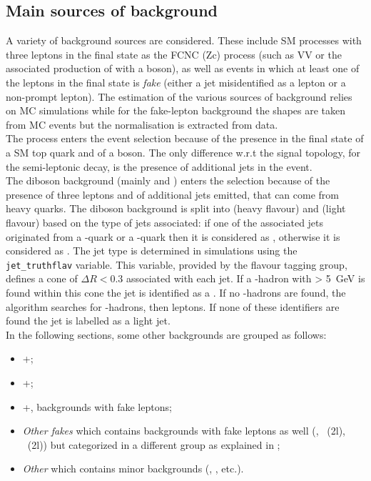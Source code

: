 \subsection{Main sources of background}
\label{sec:background}
A variety of background sources are considered.
These include SM processes with three leptons in the final state as the FCNC \ttbar (Zc)
process (such as VV or the associated production of \ttbar with
a \PZ boson), as well as events in which at least one of the leptons
in the final state is \textit{fake} (either a jet misidentified as a
lepton or a non-prompt lepton).
The estimation of the various sources of background relies on MC
simulations while for the
\ttbar fake-lepton background the shapes are taken from MC events but the
normalisation is extracted from data. \\
The \ttZ process enters the event selection because of the presence in the
final state of a SM top quark and of a \PZ boson. The only difference
w.r.t the signal topology, for the semi-leptonic \ttbar decay, is the
presence of additional jets in the event. \\
The diboson background (mainly \PW\PZ and \PZ\PZ) enters the selection because of the presence
of three leptons and of additional jets emitted, that can come from heavy
quarks. 
The diboson background is split into \VVHF (heavy flavour) and \VVLF (light flavour) based on the type of jets associated:
if one of the associated jets originated from a \Pqb-quark or a \Pqc-quark then it is considered as \VVHF, otherwise it is considered as \VVLF. %
The jet type is determined in simulations using the \texttt{jet\_truthflav} variable.
This variable, provided by the flavour tagging group, defines a cone of $\Delta R < 0.3$ associated with each jet.
If a \Pqb-hadron with \pT > \SI{5}{\GeV} is found within this cone the jet is identified as a \bjet.
If no \Pqb-hadrons are found, the algorithm searches for \Pqc-hadrons, then \Pgt leptons.
If none of these identifiers are found the jet is labelled as a light jet.\\
In the following sections, some other backgrounds are grouped as follows:
\begin{itemize}
	\item \ttZ+\tWZ;
	\item \ttW+\ttH;
	\item \ttbar+\Wt, backgrounds with fake leptons;
	\item \textit{Other fakes} which contains backgrounds with fake leptons as well (\Zjets, \VV~(2l), \ttZ~(2l)) but categorized in a different group as explained in ;
	\item \textit{Other} which contains minor backgrounds (\ttt, \VVV,  \ttWW etc.).
\end {itemize}

